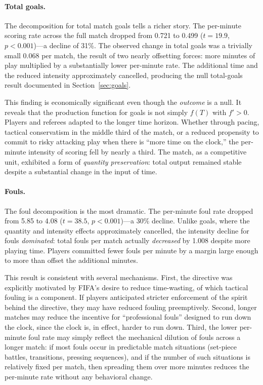 \paragraph{Total goals.}  The decomposition for total match goals tells a richer story.  The per-minute scoring rate across the full match dropped from 0.721 to 0.499 ($t = 19.9$, $p < 0.001$)---a decline of 31\%.  The observed change in total goals was a trivially small 0.068 per match, the result of two nearly offsetting forces: more minutes of play multiplied by a substantially lower per-minute rate.  The additional time and the reduced intensity approximately cancelled, producing the null total-goals result documented in Section~\ref{sec:goals}.

This finding is economically significant even though the \emph{outcome} is a null.  It reveals that the production function for goals is not simply $f(T)$ with $f' > 0$.  Players and referees adapted to the longer time horizon.  Whether through pacing, tactical conservatism in the middle third of the match, or a reduced propensity to commit to risky attacking play when there is ``more time on the clock,'' the per-minute intensity of scoring fell by nearly a third.  The match, as a competitive unit, exhibited a form of \emph{quantity preservation}: total output remained stable despite a substantial change in the input of time.

\paragraph{Fouls.}  The foul decomposition is the most dramatic.  The per-minute foul rate dropped from 5.85 to 4.08 ($t = 38.5$, $p < 0.001$)---a 30\% decline.  Unlike goals, where the quantity and intensity effects approximately cancelled, the intensity decline for fouls \emph{dominated}: total fouls per match actually \emph{decreased} by 1.008 despite more playing time.  Players committed fewer fouls per minute by a margin large enough to more than offset the additional minutes.

This result is consistent with several mechanisms.  First, the directive was explicitly motivated by FIFA's desire to reduce time-wasting, of which tactical fouling is a component.  If players anticipated stricter enforcement of the spirit behind the directive, they may have reduced fouling preemptively.  Second, longer matches may reduce the incentive for ``professional fouls'' designed to run down the clock, since the clock is, in effect, harder to run down.  Third, the lower per-minute foul rate may simply reflect the mechanical dilution of fouls across a longer match: if most fouls occur in predictable match situations (set-piece battles, transitions, pressing sequences), and if the number of such situations is relatively fixed per match, then spreading them over more minutes reduces the per-minute rate without any behavioral change.

